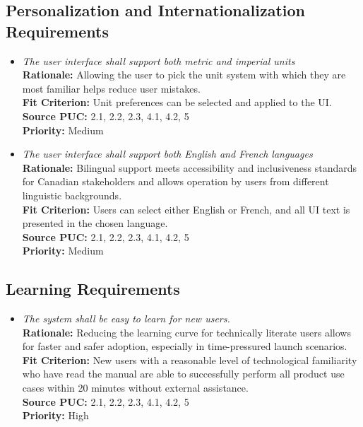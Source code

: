 \documentclass[12pt]{article}
\begin{document}
\subsection{Personalization and Internationalization Requirements}
\begin{itemize}[leftmargin=*]
  \item[PI-1] \emph{The user interface shall support both metric and imperial units}\\[2mm]
        \textbf{Rationale:} Allowing the user to pick the unit system with which they are most familiar helps reduce user mistakes. \\
        \textbf{Fit Criterion:} Unit preferences can be selected and applied to the UI.\\
        \textbf{Source PUC:} 2.1, 2.2, 2.3, 4.1, 4.2, 5 \\
        \textbf{Priority:} Medium
  \item[PI-2] \emph{The user interface shall support both English and French
          languages}\\[2mm]
        \textbf{Rationale:} Bilingual support meets accessibility and inclusiveness standards for Canadian stakeholders and allows operation by users from different linguistic backgrounds.\\
        \textbf{Fit Criterion:} Users can select either English or French, and all UI text is presented in the chosen language.\\
        \textbf{Source PUC:} 2.1, 2.2, 2.3, 4.1, 4.2, 5 \\
        \textbf{Priority:} Medium
\end{itemize}

\subsection{Learning Requirements}
\begin{itemize}[leftmargin=*]
  \item[LR-1] \emph{The system shall be easy to learn for new users.}\\[2mm]
        \textbf{Rationale:} Reducing the learning curve for technically literate users allows for faster and safer adoption, especially in time-pressured launch scenarios.\\
        \textbf{Fit Criterion:} New users with a reasonable level of technological familiarity who have read the manual are able to successfully perform all product use cases within 20 minutes without external assistance.\\
        \textbf{Source PUC:} 2.1, 2.2, 2.3, 4.1, 4.2, 5 \\
        \textbf{Priority:} High

\end{itemize}
\end{document}
